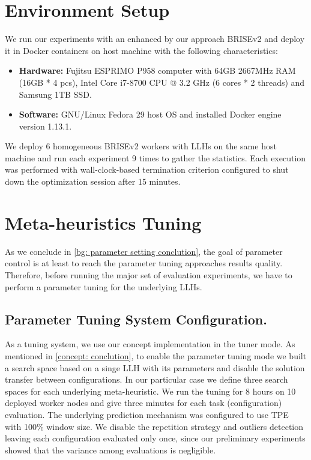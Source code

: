 \section{Environment Setup}\label{eval: environment}
We run our experiments with an enhanced by our approach BRISEv2 and deploy it in Docker containers on host machine with the following characteristics:
\begin{itemize}
	\item \textbf{Hardware:} Fujitsu ESPRIMO P958 computer with 64GB 2667MHz RAM (16GB * 4 pcs), Intel Core i7-8700 CPU @ 3.2 GHz (6 cores * 2 threads) and Samsung 1TB SSD.
	
	\item \textbf{Software:} GNU/Linux Fedora 29 host OS and installed Docker engine version 1.13.1.
\end{itemize}

We deploy 6 homogeneous BRISEv2 workers with LLHs on the same host machine and run each experiment 9 times to gather the statistics. Each execution was performed with wall-clock-based termination criterion configured to shut down the optimization session after 15 minutes.


\section{Meta-heuristics Tuning}\label{eval: mh tuning}
As we conclude in \cref{bg: parameter setting conclution}, the goal of parameter control is at least to reach the parameter tuning approaches results quality. Therefore, before running the major set of evaluation experiments, we have to perform a parameter tuning for the underlying LLHs.

\subsection{Parameter Tuning System Configuration.} 
As a tuning system, we use our concept implementation in the tuner mode. As mentioned in \cref{concept: conclution}, to enable the parameter tuning mode we built a search space based on a singe LLH with its parameters and disable the solution transfer between configurations. In our particular case we define three search spaces for each underlying meta-heuristic. We run the tuning for 8 hours on 10 deployed worker nodes and give three minutes for each task (configuration) evaluation. The underlying prediction mechanism was configured to use TPE with 100\% window size. We disable the repetition strategy and outliers detection leaving each configuration evaluated only once, since our preliminary experiments showed that the variance among evaluations is negligible.


